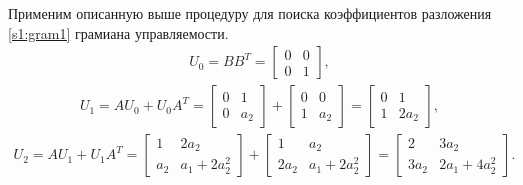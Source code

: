 \documentclass[../main.tex]{subfiles}
\begin{document}
Применим описанную выше процедуру для поиска коэффициентов разложения \eqref{s1:gram1} грамиана управляемости.
\begin{gather*}
 U_0 = B B^T = \left[ {\begin{array}{*{20}{c}}
 0&0\\
 0&1
 \end{array}}\right],
\end{gather*}
\begin{gather*}
 U_1 = A U_0 + U_0 A^T = \left[ {\begin{array}{*{20}{c}}
 0&1\\
 0&a_2
 \end{array}}\right] + \left[ {\begin{array}{*{20}{c}}
 0&0\\
 1&a_2
 \end{array}}\right] = \left[ {\begin{array}{*{20}{c}}
 0&1\\
 1&2 a_2
 \end{array}}\right],
\end{gather*}
\begin{gather*}
 U_2 = A U_1 + U_1 A^T = \left[ {\begin{array}{*{20}{c}}
 1&2a_2\\
 a_2&a_1+2a_2^2
 \end{array}}\right] + \left[ {\begin{array}{*{20}{c}}
 1&a_2\\
 2a_2&a_1+2a_2^2
 \end{array}}\right] = \left[ {\begin{array}{*{20}{c}}
 2&3a_2\\
 3a_2&2a_1+4a_2^2
 \end{array}}\right].
\end{gather*}
 
\end{document}
